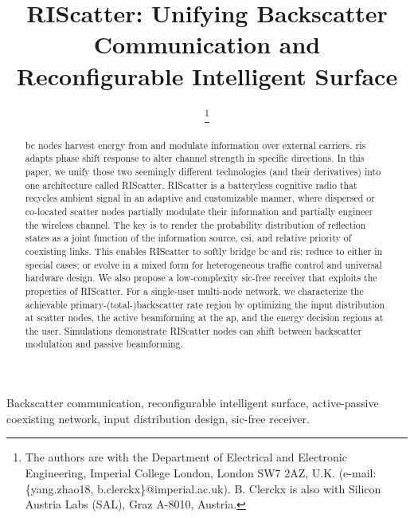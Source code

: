 \documentclass[journal]{IEEEtran}
\begin{document}
\title{RIScatter: Unifying Backscatter Communication and Reconfigurable Intelligent Surface}
\author{
	\thanks{
		The authors are with the Department of Electrical and Electronic Engineering, Imperial College London, London SW7 2AZ, U.K. (e-mail: \{yang.zhao18, b.clerckx\}@imperial.ac.uk).
		B. Clerckx is also with Silicon Austria Labs (SAL), Graz A-8010, Austria.
	}
}
\maketitle

\begin{abstract}
	\gls{bc} nodes harvest energy from and modulate information over external carriers.
	\gls{ris} adapts phase shift response to alter channel strength in specific directions.
	In this paper, we unify those two seemingly different technologies (and their derivatives) into one architecture called RIScatter.
	RIScatter is a batteryless cognitive radio that recycles ambient signal in an adaptive and customizable manner, where dispersed or co-located scatter nodes partially modulate their information and partially engineer the wireless channel.
	The key is to render the probability distribution of reflection states as a joint function of the information source, \gls{csi}, and relative priority of coexisting links.
	This enables RIScatter to softly bridge \gls{bc} and \gls{ris}; reduce to either in special cases; or evolve in a mixed form for heterogeneous traffic control and universal hardware design.
	We also propose a low-complexity \gls{sic}-free receiver that exploits the properties of RIScatter.
	For a single-user multi-node network, we characterize the achievable primary-(total-)backscatter rate region by optimizing the input distribution at scatter nodes, the active beamforming at the \gls{ap}, and the energy decision regions at the user.
	Simulations demonstrate RIScatter nodes can shift between backscatter modulation and passive beamforming.
\end{abstract}

\begin{IEEEkeywords}
	Backscatter communication, reconfigurable intelligent surface, active-passive coexisting network, input distribution design, \gls{sic}-free receiver.
\end{IEEEkeywords}

\glsresetall
\end{document}

